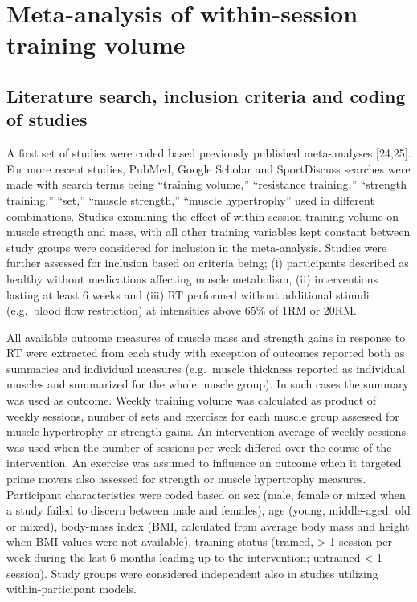 \documentclass[twoside,10pt]{gihclass} %
\begin{document}
\hypertarget{meta-analysis-of-within-session-training-volume}{%
\section{Meta-analysis of within-session training volume}\label{meta-analysis-of-within-session-training-volume}}

\hypertarget{literature-search-inclusion-criteria-and-coding-of-studies}{%
\subsection{Literature search, inclusion criteria and coding of studies}\label{literature-search-inclusion-criteria-and-coding-of-studies}}

A first set of studies were coded based previously published
meta-analyses {[}24,25{]}. For more recent studies, PubMed, Google
Scholar and SportDiscuss searches were made with search terms being
``training volume,'' ``resistance training,'' ``strength training,'' ``set,''
``muscle strength,'' ``muscle hypertrophy'' used in different combinations.
Studies examining the effect of within-session training volume on muscle
strength and mass, with all other training variables kept constant
between study groups were considered for inclusion in the meta-analysis.
Studies were further assessed for inclusion based on criteria being; (i)
participants described as healthy without medications affecting muscle
metabolism, (ii) interventions lasting at least 6 weeks and (iii) RT
performed without additional stimuli (e.g.~blood flow restriction) at
intensities above 65\% of 1RM or 20RM.

All available outcome measures of muscle mass and strength gains in
response to RT were extracted from each study with exception of outcomes
reported both as summaries and individual measures (e.g.~muscle
thickness reported as individual muscles and summarized for the whole
muscle group). In such cases the summary was used as outcome. Weekly
training volume was calculated as product of weekly sessions, number of
sets and exercises for each muscle group assessed for muscle hypertrophy
or strength gains. An intervention average of weekly sessions was used
when the number of sessions per week differed over the course of the
intervention. An exercise was assumed to influence an outcome when it
targeted prime movers also assessed for strength or muscle hypertrophy
measures. Participant characteristics were coded based on sex (male,
female or mixed when a study failed to discern between male and
females), age (young, middle-aged, old or mixed), body-mass index (BMI,
calculated from average body mass and height when BMI values were not
available), training status (trained, \textgreater{} 1 session per week during the
last 6 months leading up to the intervention; untrained \textless{} 1 session).
Study groups were considered independent also in studies utilizing
within-participant models.
\end{document}
